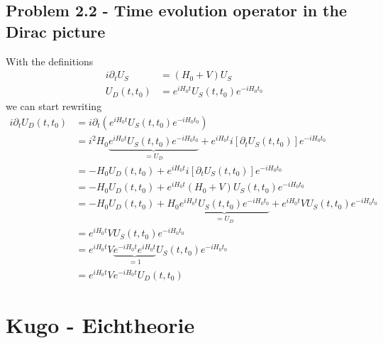 \documentclass[../main.tex]{subfiles}
\begin{document}
\subsection{Problem 2.2 - Time evolution operator in the Dirac picture}
With the definitions
\begin{align}
i\partial_tU_S&=(H_0+V)U_S\\
U_D(t,t_0)&=e^{iH_0t}U_S(t,t_0)e^{-iH_0t_0}
\end{align}
we can start rewriting
\begin{align}
i\partial_t U_D(t,t_0)
&=i\partial_t \left(e^{iH_0t}U_S(t,t_0)e^{-iH_0t_0}\right)\\
&=i^2H_0\underbrace{e^{iH_0t}U_S(t,t_0)e^{-iH_0t_0}}_{=U_D}+e^{iH_0t}i[\partial_tU_S(t,t_0)]e^{-iH_0t_0}\\
&=-H_0 U_D(t,t_0)+e^{iH_0t}i[\partial_tU_S(t,t_0)]e^{-iH_0t_0}\\
&=-H_0 U_D(t,t_0)+e^{iH_0t}(H_0+V)U_S(t,t_0)e^{-iH_0t_0}\\
&=-H_0 U_D(t,t_0)+H_0\underbrace{e^{iH_0t}U_S(t,t_0)e^{-iH_0t_0}}_{=U_D}+e^{iH_0t}VU_S(t,t_0)e^{-iH_0t_0}\\
&=e^{iH_0t}VU_S(t,t_0)e^{-iH_0t_0}\\
&=e^{iH_0t}V\underbrace{e^{-iH_0t}e^{iH_0t}}_{=1}U_S(t,t_0)e^{-iH_0t_0}\\
&=e^{iH_0t}Ve^{-iH_0t}U_D(t,t_0)
\end{align}


\newpage
\section{{\sc Kugo} - Eichtheorie}
\end{document}

